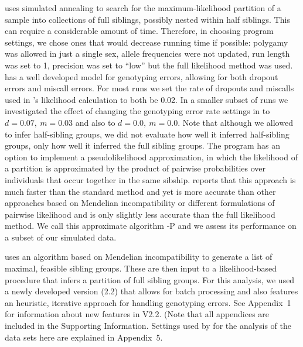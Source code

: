 \colony{} uses simulated annealing to search for the maximum-likelihood partition of a sample into 
collections of full siblings, possibly nested within half siblings.  This can require a considerable 
amount of time.  Therefore, in choosing program settings, we chose ones that would decrease running 
time if possible: polygamy was allowed in just a single sex, allele frequencies were not updated, run 
length was set to 1, precision was set to ``low'' but the full likelihood method was used. \colony{} 
has a well developed model for genotyping errors, allowing for both dropout errors and miscall errors. 
For most runs we set the rate of dropouts and miscalls used in \colony{}'s likelihood calculation to 
both be 0.02.  In a smaller subset of runs we investigated the effect of changing the genotyping error 
rate settings in \colony{} to $d=0.07,\ m=0.03$ and also to $d=0.0,\ m=0.0$.    Note that although we 
allowed \colony{} to infer half-sibling groups, we did not evaluate how well it inferred half-sibling 
groups, only how well it inferred the full sibling groups. The program \colony{} has an option to 
implement a pseudolikelihood approximation, in which the likelihood of a partition is approximated by 
the product of pairwise probabilities over individuals that occur together in the same sibship. 
\citet{Wang2012pairwise} reports that this approach is much faster than the standard \colony{} method 
and yet is more accurate than other approaches based on Mendelian incompatibility or different 
formulations of pairwise likelihood and is only slightly less accurate than the full likelihood method.  
We call this approximate \colony{} algorithm \colony{}-P and we assess its performance on a subset of 
our simulated data.


\prt{} uses an algorithm based on Mendelian incompatibility to generate a list of maximal, feasible 
sibling groups.  These are then input to a likelihood-based procedure that infers a partition of full 
sibling groups.  For this analysis, we used a newly developed version (2.2) that allows for batch 
processing and also features an heuristic, iterative approach for handling genotyping errors. See 
Appendix~1 for information about new features in V2.2. (Note that all appendices are included in the
Supporting Information.  Settings used by
\prt{} for the analysis of the data sets here are explained in Appendix~5. 



